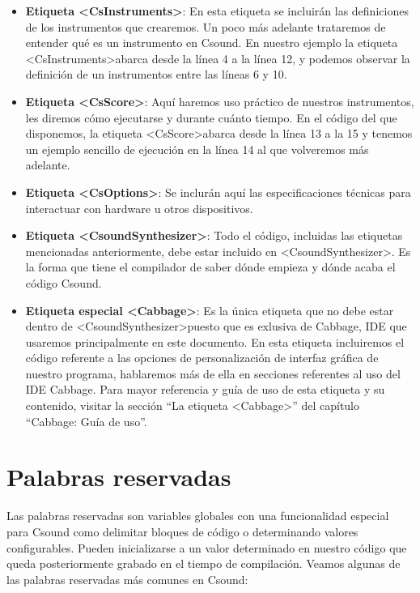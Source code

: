 \begin{itemize}
 \item \textbf{Etiqueta \textless CsInstruments\textgreater}: En esta etiqueta se incluirán las definiciones de los instrumentos que crearemos. Un poco más adelante trataremos de entender qué es un instrumento en Csound. En nuestro ejemplo la etiqueta \textless CsInstruments\textgreater abarca desde la línea 4 a la línea 12, y podemos observar la definición de un instrumentos entre las líneas 6 y 10.
 \item \textbf{Etiqueta \textless CsScore\textgreater}: Aquí haremos uso práctico de nuestros instrumentos, les diremos cómo ejecutarse y durante cuánto tiempo. En el código del que disponemos, la etiqueta \textless CsScore\textgreater abarca desde la línea 13 a la 15 y tenemos un ejemplo sencillo de ejecución en la línea 14 al que volveremos más adelante.
 \item \textbf{Etiqueta \textless CsOptions\textgreater}: Se inclurán aquí las especificaciones técnicas para interactuar con hardware u otros dispositivos.
 \item \textbf{Etiqueta \textless CsoundSynthesizer\textgreater}: Todo el código, incluidas las etiquetas mencionadas anteriormente, debe estar incluido en \textless CsoundSynthesizer\textgreater. Es la forma que tiene el compilador de saber dónde empieza y dónde acaba el código Csound.
 \item \textbf{Etiqueta especial \textless Cabbage\textgreater}: Es la única etiqueta que no debe estar dentro de \textless CsoundSynthesizer\textgreater puesto que es exlusiva de Cabbage, IDE que usaremos principalmente en este documento. En esta etiqueta incluiremos el código referente a las opciones de personalización de interfaz gráfica de nuestro programa, hablaremos más de ella en secciones referentes al uso del IDE Cabbage. Para mayor referencia y guía de uso de esta etiqueta y su contenido, visitar la sección ``La etiqueta \textless Cabbage\textgreater'' del capítulo ``Cabbage: Guía de uso''.
\end{itemize}

\section{Palabras reservadas}\label{sec:reservadas} 

Las palabras reservadas son variables globales con una funcionalidad especial para Csound como delimitar bloques de código o determinando valores configurables. Pueden inicializarse a un valor determinado en nuestro código que queda posteriormente grabado en el tiempo  de compilación.
Veamos algunas de las palabras reservadas más comunes en Csound:

